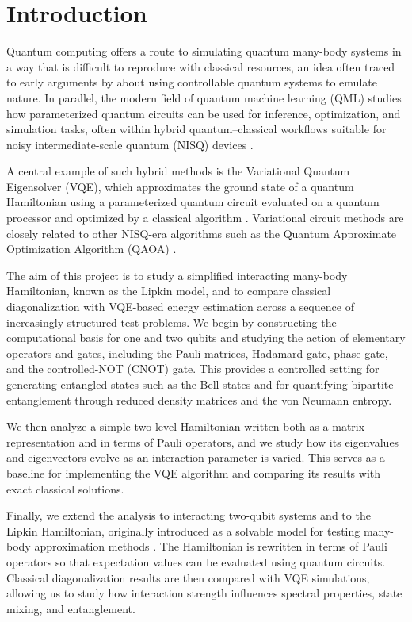 \section{Introduction}\label{section:Introduction}

Quantum computing offers a route to simulating quantum many-body systems in a way that is difficult to reproduce with classical resources, an idea often traced to early arguments by \textcite{feynman1982simulating} about using controllable quantum systems to emulate nature. In parallel, the modern field of quantum machine learning (QML) studies how parameterized quantum circuits can be used for inference, optimization, and simulation tasks, often within hybrid quantum--classical workflows suitable for noisy intermediate-scale quantum (NISQ) devices \parencite{schuld2018supervised,schuld2021mlqc,carleo2019mlphys}. 

A central example of such hybrid methods is the Variational Quantum Eigensolver (VQE), which approximates the ground state of a quantum Hamiltonian using a parameterized quantum circuit evaluated on a quantum processor and optimized by a classical algorithm \parencite{peruzzo2014vqe,mcclean2016theory}. Variational circuit methods are closely related to other NISQ-era algorithms such as the Quantum Approximate Optimization Algorithm (QAOA) \parencite{farhi2014qaoa}.

The aim of this project is to study a simplified interacting many-body Hamiltonian, known as the Lipkin model, and to compare classical diagonalization with VQE-based energy estimation across a sequence of increasingly structured test problems. We begin by constructing the computational basis for one and two qubits and studying the action of elementary operators and gates, including the Pauli matrices, Hadamard gate, phase gate, and the controlled-NOT (CNOT) gate. This provides a controlled setting for generating entangled states such as the Bell states and for quantifying bipartite entanglement through reduced density matrices and the von Neumann entropy.

We then analyze a simple two-level Hamiltonian written both as a matrix representation and in terms of Pauli operators, and we study how its eigenvalues and eigenvectors evolve as an interaction parameter is varied. This serves as a baseline for implementing the VQE algorithm and comparing its results with exact classical solutions.

Finally, we extend the analysis to interacting two-qubit systems and to the Lipkin Hamiltonian, originally introduced as a solvable model for testing many-body approximation methods \parencite{lipkin1965}. The Hamiltonian is rewritten in terms of Pauli operators so that expectation values can be evaluated using quantum circuits. Classical diagonalization results are then compared with VQE simulations, allowing us to study how interaction strength influences spectral properties, state mixing, and entanglement.